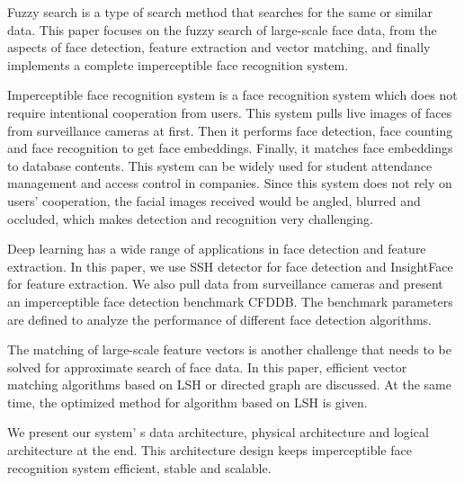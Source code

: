 \begin{englishabstract}

Fuzzy search is a type of search method that searches for the same or similar data. This paper focuses on the fuzzy search of large-scale face data, from the aspects of face detection, feature extraction and vector matching, and finally implements a complete imperceptible face recognition system.

Imperceptible face recognition system is a face recognition system which does not require intentional cooperation from users. This system pulls live images of faces from surveillance cameras at first. Then it performs face detection, face counting and face recognition to get face embeddings. Finally, it matches face embeddings to database contents. This system can be widely used for student attendance management and access control in companies. Since this system does not rely on users’ cooperation, the facial images received would be angled, blurred and occluded, which makes detection and recognition very challenging.

Deep learning has a wide range of applications in face detection and feature extraction. In this paper, we use SSH detector \cite{najibi2017ssh} for face detection and InsightFace\cite{deng2018arcface} for feature extraction. We also pull data from surveillance cameras and present an imperceptible face detection benchmark CFDDB. The benchmark parameters are defined to analyze the performance of different face detection algorithms.

The matching of large-scale feature vectors is another challenge that needs to be solved for approximate search of face data. In this paper, efficient vector matching algorithms based on LSH or directed graph are discussed. At the same time, the optimized method for algorithm based on LSH is given.

We present our system’ s data architecture, physical architecture and logical architecture at the end. This architecture design keeps imperceptible face recognition system efficient, stable and scalable.

\end{englishabstract}

